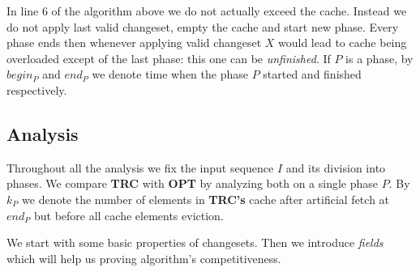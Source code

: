 In line 6 of the algorithm above we do not actually exceed the cache. Instead 
we do not apply last valid changeset, empty the cache and start new phase. 
Every phase ends then whenever applying valid changeset $X$ would lead to cache 
being overloaded except of the last phase: this one can be \textit{unfinished}. 
If $P$ is a phase, by $begin_P$ and $end_P$ we denote time when the phase $P$ 
started and finished respectively.

\subsection{Analysis}
Throughout all the analysis we fix the input sequence $I$ and its division into 
phases. We compare \textbf{TRC} with \textbf{OPT} by analyzing both on a single 
phase $P$. By $k_P$ we denote the number of elements in \textbf{TRC's} cache 
after artificial fetch at $end_P$ but before all cache elements eviction.

We start with some basic properties of changesets. Then we introduce 
\textit{fields} which will help us proving algorithm's competitiveness.

